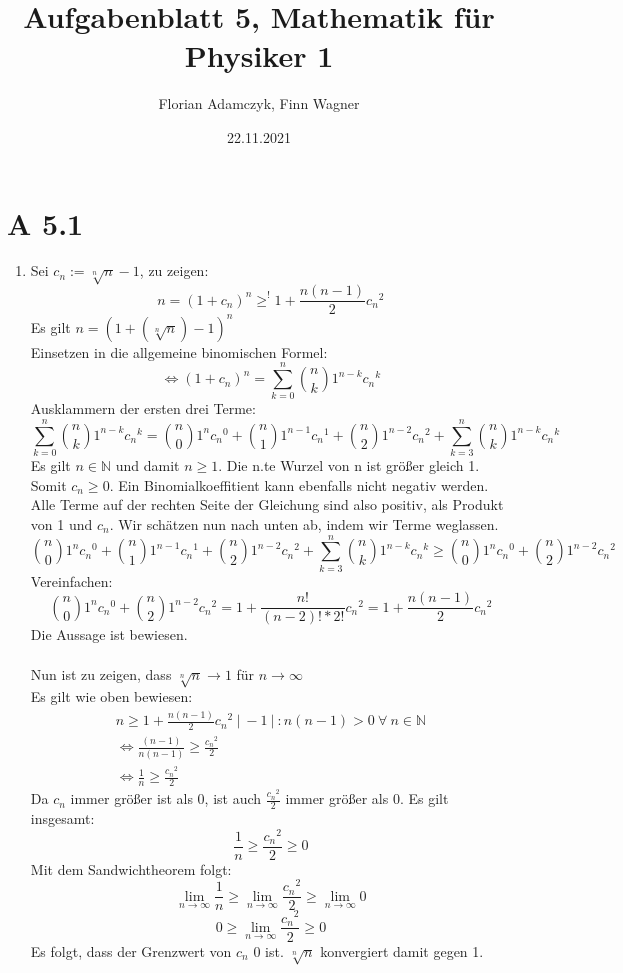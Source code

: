 \documentclass{article}
\date{22.11.2021}
\title{Aufgabenblatt 5, Mathematik für Physiker 1}
\author{Florian Adamczyk, Finn Wagner}
\begin{document}
    \maketitle

    \section*{A 5.1}
    \begin{enumerate}[ label = (\alph*)]
        \item Sei \(c_n := \sqrt[n]{n} - 1\), zu zeigen:
        \[ n = {(1+c_n)}^n \geq^! 1 + \frac{n (n-1)}{2} {c_n}^2 \]
        Es gilt \( n = {(1 + (\sqrt[n]{n}) -1)}^n \) \\
        Einsetzen in die allgemeine binomischen Formel:
        \[ \Leftrightarrow {(1+c_n)}^n = \sum_{k=0}^{n} \binom{n}{k} 1^{n-k} {c_n}^k \]
        Ausklammern der ersten drei Terme:
        \[ \sum_{k=0}^{n} \binom{n}{k} 1^{n-k} {c_n}^k = \binom{n}{0} 1^n {c_n}^0 + \binom{n}{1} 1^{n-1} {c_n}^1 + \binom{n}{2} 1^{n-2} {c_n}^2 + \sum_{k=3}^{n} \binom{n}{k} 1^{n-k} {c_n}^k \]
        Es gilt \(n \in \mathbb{N}\) und damit \(n \geq 1\). Die n.te Wurzel von n ist größer gleich 1. Somit \(c_n \geq 0\).
        Ein Binomialkoeffitient kann ebenfalls nicht negativ werden. Alle Terme auf der rechten Seite der Gleichung sind also positiv, als Produkt von 1 und \(c_n\).
        Wir schätzen nun nach unten ab, indem wir Terme weglassen.
        \[ \binom{n}{0} 1^n {c_n}^0 + \binom{n}{1} 1^{n-1} {c_n}^1 + \binom{n}{2} 1^{n-2} {c_n}^2 + \sum_{k=3}^{n} \binom{n}{k} 1^{n-k} {c_n}^k \geq \binom{n}{0} 1^n {c_n}^0 + \binom{n}{2} 1^{n-2} {c_n}^2 \]
        Vereinfachen:
        \[ \binom{n}{0} 1^n {c_n}^0 + \binom{n}{2} 1^{n-2} {c_n}^2 = 1 + \frac{n!}{(n-2)! * 2!} {c_n}^2 = 1 + \frac{n (n-1)}{2} {c_n}^2 \]
        Die Aussage ist bewiesen. \\ \\
        Nun ist zu zeigen, dass \(\sqrt[n]{n} \to 1\) für \(n \to \infty \) \\
        Es gilt wie oben bewiesen: 
        \begin{gather*}
            n \geq 1 + \frac{n (n-1)}{2} {c_n}^2 \ | \ -1 \ | \ : n(n-1) > 0 \ \forall \ n \in \mathbb{N} \\
            \Leftrightarrow \frac{(n-1)}{n(n-1)} \geq \frac{{c_n}^2}{2} \\
            \Leftrightarrow \frac{1}{n} \geq \frac{{c_n}^2}{2}
        \end{gather*}
        Da \(c_n\) immer größer ist als 0, ist auch \(\frac{{c_n}^2}{2}\) immer größer als 0. Es gilt insgesamt:
        \[ \frac{1}{n} \geq \frac{{c_n}^2}{2} \geq 0 \]
        Mit dem Sandwichtheorem folgt:
        \[ \lim_{n \to \infty} \frac{1}{n} \geq \lim_{n \to \infty} \frac{{c_n}^2}{2} \geq \lim_{n \to \infty} 0 \]
        \[ 0 \geq \lim_{n \to \infty} \frac{{c_n}^2}{2} \geq 0 \]
        Es folgt, dass der Grenzwert von \(c_n\) 0 ist. \(\sqrt[n]{n}\) konvergiert damit gegen 1.


\end{enumerate}
\end{document}
